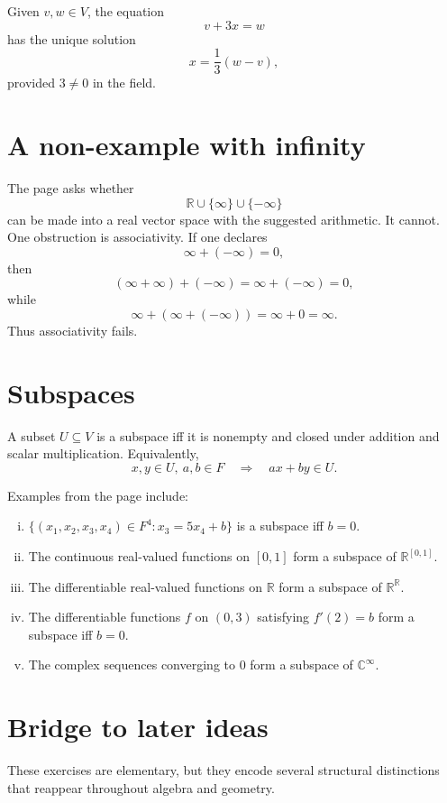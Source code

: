 Given \(v,w\in V\), the equation
\[
  v+3x=w
\]
has the unique solution
\[
  x=\frac13(w-v),
\]
provided \(3\neq0\) in the field.

\section{A non-example with infinity}

The page asks whether
\[
  \mathbb R\cup\{\infty\}\cup\{-\infty\}
\]
can be made into a real vector space with the suggested arithmetic.  It cannot.  One obstruction is associativity.  If one declares
\[
  \infty+(-\infty)=0,
\]
then
\[
  (\infty+\infty)+(-\infty)=\infty+(-\infty)=0,
\]
while
\[
  \infty+(\infty+(-\infty))=\infty+0=\infty.
\]
Thus associativity fails.

\section{Subspaces}

A subset \(U\subseteq V\) is a subspace iff it is nonempty and closed under addition and scalar multiplication.  Equivalently,
\[
  x,y\in U,\ a,b\in F\quad\Rightarrow\quad ax+by\in U.
\]

Examples from the page include:
\begin{enumerate}[(i)]
  \item \(\{(x_1,x_2,x_3,x_4)\in F^4:x_3=5x_4+b\}\) is a subspace iff \(b=0\).
  \item The continuous real-valued functions on \([0,1]\) form a subspace of \(\mathbb R^{[0,1]}\).
  \item The differentiable real-valued functions on \(\mathbb R\) form a subspace of \(\mathbb R^{\mathbb R}\).
  \item The differentiable functions \(f\) on \((0,3)\) satisfying \(f'(2)=b\) form a subspace iff \(b=0\).
  \item The complex sequences converging to \(0\) form a subspace of \(\mathbb C^\infty\).
\end{enumerate}


\section{Bridge to later ideas}

These exercises are elementary, but they encode several structural distinctions that reappear throughout algebra and geometry.


